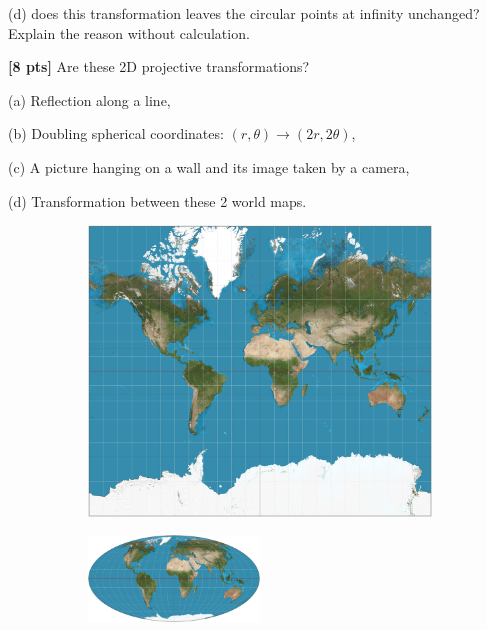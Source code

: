 \documentclass[11pt,addpoints,answers]{exam}
\numberwithin{equation}{section} %
\numberwithin{figure}{section} %
\numberwithin{table}{section} %
\begin{document}
\begin{questions}
(d) does this transformation leaves the circular points at infinity unchanged? Explain the reason without calculation.

\begin{tcolorbox}[height fill, width=\textwidth, blank, borderline={0.5pt}{-2pt},halign=left, valign=top, nobeforeafter, size=normal]


\end{tcolorbox}

\question \textbf{[8 pts]} Are these 2D projective transformations?

(a) Reflection along a line,

(b) Doubling spherical coordinates: $(r,\theta) \rightarrow (2r, 2\theta)$,

(c) A picture hanging on a wall and its image taken by a camera,

(d) Transformation between these 2 world maps.
\begin{figure}[h!]
    \centering
    \begin{subfigure}{0.48\linewidth}
        \centering
        {\includegraphics[width=0.33\linewidth]{figures/Mercator_projection_SW.jpg}}
    \end{subfigure}
    \begin{subfigure}{0.48\linewidth}
        \centering
        {\includegraphics[width=0.5\textwidth]{figures/Mollweide_projection_SW.jpg}}
    \end{subfigure}
\end{figure}

\begin{tcolorbox}[height fill, width=\textwidth, blank, borderline={0.5pt}{-2pt},halign=left, valign=top, nobeforeafter, size=normal]


\end{tcolorbox}


\end{questions}
\end{document}
